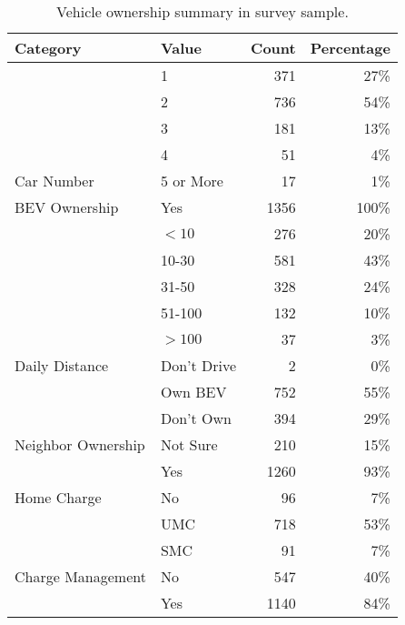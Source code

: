\begin{table}[H]
\centering
\begin{threeparttable}
\caption{Vehicle ownership summary in survey sample.}
\centering
\begin{tabular}[t]{llrr}
\toprule
\textbf{Category} & \textbf{Value} & \textbf{Count} & \textbf{Percentage}\\
\midrule
 & 1 & 371 & 27\%\\

 & 2 & 736 & 54\%\\

 & 3 & 181 & 13\%\\

 & 4 & 51 & 4\%\\

\multirow{-5}{*}{\raggedright\arraybackslash Car Number} & 5 or More & 17 & 1\%\\
\cmidrule(lr){1-4} 
\multirow{-1}{*}{\raggedright\arraybackslash BEV Ownership} & Yes & 1356 & 100\%\\
\cmidrule(lr){1-4}
 & $<10$ & 276 & 20\%\\

 & 10-30 & 581 & 43\%\\

 & 31-50 & 328 & 24\%\\

 & 51-100 & 132 & 10\%\\

 & $>100$ & 37 & 3\%\\

\multirow{-6}{*}{\raggedright\arraybackslash Daily Distance} & Don't Drive & 2 & 0\%\\
\cmidrule(lr){1-4}
 & Own BEV & 752 & 55\%\\

 & Don't Own & 394 & 29\%\\

\multirow{-3}{*}{\raggedright\arraybackslash Neighbor Ownership} & Not Sure & 210 & 15\%\\
\cmidrule(lr){1-4}
 & Yes & 1260 & 93\%\\

\multirow{-2}{*}{\raggedright\arraybackslash Home Charge} & No & 96 & 7\%\\
\cmidrule(lr){1-4}
 & UMC & 718 & 53\%\\

 & SMC & 91 & 7\%\\

\multirow{-3}{*}{\raggedright\arraybackslash Charge Management} & No & 547 & 40\%\\
\cmidrule(lr){1-4}
 & Yes & 1140 & 84\%\\


\end{tabular}
\end{threeparttable}
\end{table}
